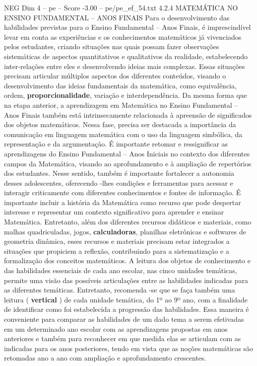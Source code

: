 \begin{textsample}{NEG Dim 4 – pe – Score -3.00 – pe/pe\_ef\_54.txt}  \label{ex:f4_neg_006}
4.2.4 MATEMÁTICA NO ENSINO FUNDAMENTAL – ANOS FINAIS Para o desenvolvimento das habilidades previstas para o Ensino Fundamental – Anos Finais, é imprescindível levar em conta as experiências e os conhecimentos matemáticos já vivenciados pelos estudantes, criando situações nas quais possam fazer observações sistemáticas de aspectos quantitativos e qualitativos da realidade, estabelecendo inter-relações entre eles e desenvolvendo ideias mais complexas.
Essas situações precisam articular múltiplos aspectos dos diferentes conteúdos, visando o desenvolvimento das ideias fundamentais da matemática, como equivalência, ordem, \textbf{proporcionalidade}, variação e interdependência.
Da mesma forma que na etapa anterior, a aprendizagem em Matemática no Ensino Fundamental – Anos Finais também está intrinsecamente relacionada à apreensão de significados dos objetos matemáticos.
Nessa fase, precisa ser destacada a importância da comunicação em linguagem matemática com o uso da linguagem simbólica, da representação e da argumentação.
É importante retomar e ressignificar as aprendizagens do Ensino Fundamental – Anos Iniciais no contexto dos diferentes campos da Matemática, visando ao aprofundamento e à ampliação de repertórios dos estudantes.
Nesse sentido, também é importante fortalecer a autonomia desses adolescentes, oferecendo -lhes condições e ferramentas para acessar e interagir criticamente com diferentes conhecimentos e fontes de informação.
É importante incluir a história da Matemática como recurso que pode despertar interesse e representar um contexto significativo para aprender e ensinar Matemática.
Entretanto, além dos diferentes recursos didáticos e materiais, como malhas quadriculadas, jogos, \textbf{calculadoras}, planilhas eletrônicas e softwares de geometria dinâmica, esses recursos e materiais precisam estar integrados a situações que propiciem a reflexão, contribuindo para a sistematização e a formalização dos conceitos matemáticos.
A leitura dos objetos de conhecimento e das habilidades essenciais de cada ano escolar, nas cinco unidades temáticas, permite uma visão das possíveis articulações entre as habilidades indicadas para as diferentes temáticas.
Entretanto, recomenda -se que se faça também uma leitura ( \textbf{vertical} ) de cada unidade temática, do 1º ao 9º ano, com a finalidade de identificar como foi estabelecida a progressão das habilidades.
Essa maneira é conveniente para comparar as habilidades de um dado tema a serem efetivadas em um determinado ano escolar com as aprendizagens propostas em anos anteriores e também para reconhecer em que medida elas se articulam com as indicadas para os anos posteriores, tendo em vista que as noções matemáticas são retomadas ano a ano com ampliação e aprofundamento crescentes.

\end{textsample}
